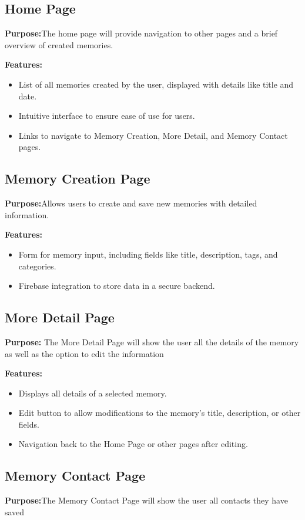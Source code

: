 \documentclass[12pt]{article}
\begin{document}
\subsection{Home Page}
\textbf{Purpose:}The home page will provide navigation to other pages and a brief overview of created memories.

\textbf{Features:}
\begin{itemize}
    \item List of all memories created by the user, displayed with details like title and date.
    \item Intuitive interface to ensure ease of use for users.
    \item Links to navigate to Memory Creation, More Detail, and Memory Contact pages.
\end{itemize}

\subsection{Memory Creation Page}
\textbf{Purpose:}Allows users to create and save new memories with detailed information.

\textbf{Features:}
\begin{itemize}
    \item Form for memory input, including fields like title, description, tags, and categories.
    \item Firebase integration to store data in a secure backend.
\end{itemize}

\subsection{More Detail Page}
\textbf{Purpose:} The More Detail Page will show the user all the details of the memory as well as the option to edit the information

\textbf{Features:}
\begin{itemize}
    \item Displays all details of a selected memory.
    \item Edit button to allow modifications to the memory’s title, description, or other fields.
    \item Navigation back to the Home Page or other pages after editing.
\end{itemize}

\subsection{Memory Contact Page}
\textbf{Purpose:}The Memory Contact Page will show the user all contacts they have saved
\end{document}
